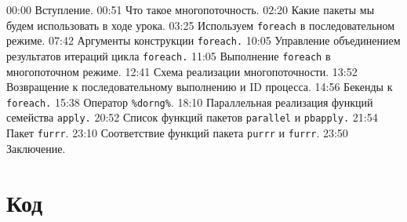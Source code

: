\documentclass[
]{book}
\begin{document}
00:00 Вступление.
00:51 Что такое многопоточность.
02:20 Какие пакеты мы будем использовать в ходе урока.
03:25 Используем \texttt{foreach} в последовательном режиме.
07:42 Аргументы конструкции \texttt{foreach.}
10:05 Управление объединением результатов итераций цикла \texttt{foreach.}
11:05 Выполнение \texttt{foreach} в многопоточном режиме.
12:41 Схема реализации многопоточности.
13:52 Возвращение к последовательному выполнению и ID процесса.
14:56 Бекенды к \texttt{foreach.}
15:38 Оператор \texttt{\%dorng\%}.
18:10 Параллельная реализация функций семейства \texttt{apply.}
20:52 Список функций пакетов \texttt{parallel} и \texttt{pbapply.}
21:54 Пакет \texttt{furrr}.
23:10 Соответствие функций пакета \texttt{purrr} и \texttt{furrr}.
23:50 Заключение.

\hypertarget{ux43aux43eux434-5}{%
\section{Код}\label{ux43aux43eux434-5}}
\end{document}
